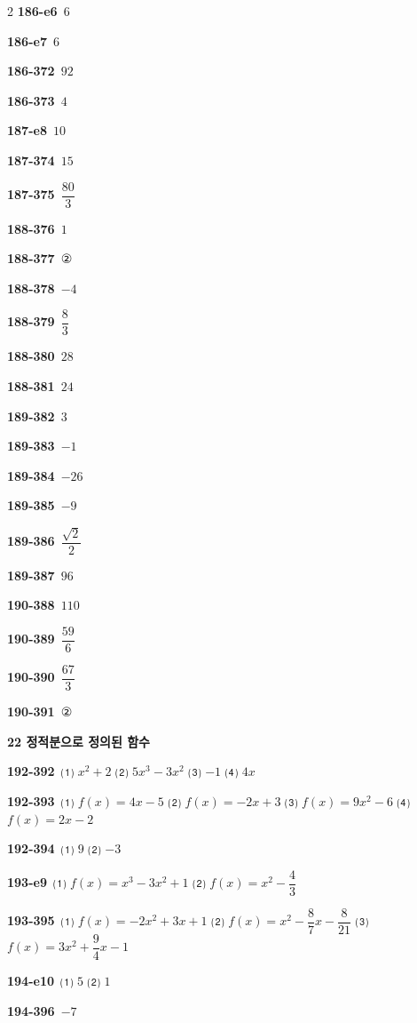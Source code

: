 \documentclass[10pt,a4paper]{article}
\begin{document}
\begin{multicols}{2}
\noindent\textbf{186-e6}\ $6$\par
\noindent\textbf{186-e7}\ $6$\par
\noindent\textbf{186-372}\ $92$\par
\noindent\textbf{186-373}\ $4$\par
\noindent\textbf{187-e8}\ $10$\par
\noindent\textbf{187-374}\ $15$\par
\noindent\textbf{187-375}\ $\dfrac{80}{3}$\par
\noindent\textbf{188-376}\ $1$\par
\noindent\textbf{188-377}\ ②\par
\noindent\textbf{188-378}\ $-4$\par
\noindent\textbf{188-379}\ $\dfrac{8}{3}$\par
\noindent\textbf{188-380}\ $28$\par
\noindent\textbf{188-381}\ $24$\par
\noindent\textbf{189-382}\ $3$\par
\noindent\textbf{189-383}\ $-1$\par
\noindent\textbf{189-384}\ $-26$\par
\noindent\textbf{189-385}\ $-9$\par
\noindent\textbf{189-386}\ $\dfrac{\sqrt{2}}{2}$\par
\noindent\textbf{189-387}\ $96$\par
\noindent\textbf{190-388}\ $110$\par
\noindent\textbf{190-389}\ $\dfrac{59}{6}$\par
\noindent\textbf{190-390}\ $\dfrac{67}{3}$\par
\noindent\textbf{190-391}\ ②\par
\noindent\textbf{22 정적분으로 정의된 함수}\par\smallskip
\noindent\textbf{192-392}\ ⑴ $x^2+2$ ⑵ $5x^3-3x^2$ ⑶ $-1$ ⑷ $4x$\par
\noindent\textbf{192-393}\ ⑴ $f(x)=4x-5$ ⑵ $f(x)=-2x+3$ ⑶ $f(x)=9x^2-6$ ⑷ $f(x)=2x-2$\par
\noindent\textbf{192-394}\ ⑴ $9$ ⑵ $-3$\par
\noindent\textbf{193-e9}\ ⑴ $f(x)=x^3-3x^2+1$ ⑵ $f(x)=x^2-\dfrac{4}{3}$\par
\noindent\textbf{193-395}\ ⑴ $f(x)=-2x^2+3x+1$ ⑵ $f(x)=x^2-\dfrac{8}{7}x-\dfrac{8}{21}$ ⑶ $f(x)=3x^2+\dfrac{9}{4}x-1$\par
\noindent\textbf{194-e10}\ ⑴ $5$ ⑵ $1$\par
\noindent\textbf{194-396}\ $-7$\par

\end{multicols}
\end{document}
